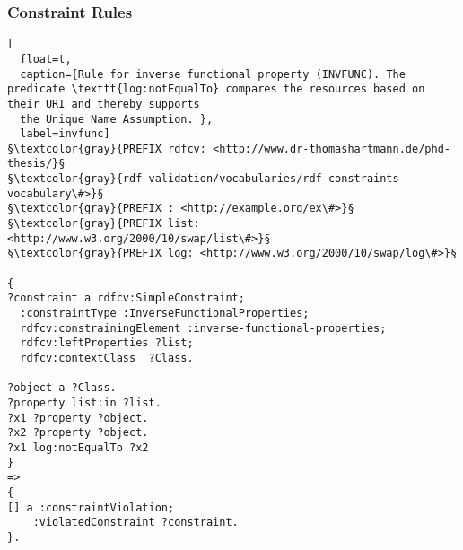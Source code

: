 \subsubsection{Constraint Rules}\label{rules}
\begin{lstlisting}[
  float=t,
  caption={Rule for inverse functional property (INVFUNC). The predicate \texttt{log:notEqualTo} compares the resources based on their URI and thereby supports 
  the Unique Name Assumption. },
  label=invfunc]
§\textcolor{gray}{PREFIX rdfcv: <http://www.dr-thomashartmann.de/phd-thesis/}§
§\textcolor{gray}{rdf-validation/vocabularies/rdf-constraints-vocabulary\#>}§
§\textcolor{gray}{PREFIX : <http://example.org/ex\#>}§
§\textcolor{gray}{PREFIX list: <http://www.w3.org/2000/10/swap/list\#>}§
§\textcolor{gray}{PREFIX log: <http://www.w3.org/2000/10/swap/log\#>}§

{
?constraint a rdfcv:SimpleConstraint;
  :constraintType :InverseFunctionalProperties;
  rdfcv:constrainingElement :inverse-functional-properties;
  rdfcv:leftProperties ?list;
  rdfcv:contextClass  ?Class.
  
?object a ?Class.
?property list:in ?list.
?x1 ?property ?object.
?x2 ?property ?object.
?x1 log:notEqualTo ?x2
}
=>
{
[] a :constraintViolation;
    :violatedConstraint ?constraint.
}.
\end{lstlisting}


